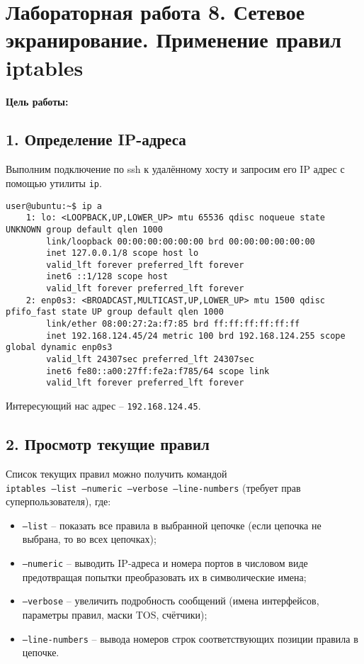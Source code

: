 \chapter*{Лабораторная работа 8. Сетевое экранирование. Применение правил iptables}

\textbf{Цель работы:} 

\section*{1. Определение IP-адреса}

Выполним подключение по ssh к удалённому хосту и запросим его IP адрес с помощью утилиты \texttt{ip}.

\begin{Verbatim}[frame=single]
    user@ubuntu:~$ ip a
    1: lo: <LOOPBACK,UP,LOWER_UP> mtu 65536 qdisc noqueue state UNKNOWN group default qlen 1000
        link/loopback 00:00:00:00:00:00 brd 00:00:00:00:00:00
        inet 127.0.0.1/8 scope host lo
        valid_lft forever preferred_lft forever
        inet6 ::1/128 scope host 
        valid_lft forever preferred_lft forever
    2: enp0s3: <BROADCAST,MULTICAST,UP,LOWER_UP> mtu 1500 qdisc pfifo_fast state UP group default qlen 1000
        link/ether 08:00:27:2a:f7:85 brd ff:ff:ff:ff:ff:ff
        inet 192.168.124.45/24 metric 100 brd 192.168.124.255 scope global dynamic enp0s3
        valid_lft 24307sec preferred_lft 24307sec
        inet6 fe80::a00:27ff:fe2a:f785/64 scope link 
        valid_lft forever preferred_lft forever
\end{Verbatim}

Интересующий нас адрес -- \texttt{192.168.124.45}.

\section*{2. Просмотр текущие правил}

Список текущих правил можно получить командой\\\texttt{iptables --list --numeric --verbose --line-numbers} (требует прав суперпользователя), где:

\begin{itemize}
    \item \texttt{--list} -- показать все правила в выбранной цепочке (если цепочка не выбрана, то во всех цепочках);
    \item \texttt{--numeric} -- выводить IP-адреса и номера портов в числовом виде предотвращая попытки преобразовать их в символические имена;
    \item \texttt{--verbose} -- увеличить подробность сообщений (имена интерфейсов, параметры правил, маски TOS, счётчики);
    \item \texttt{--line-numbers} -- вывода номеров строк соответствующих позиции правила в цепочке.
\end{itemize}

